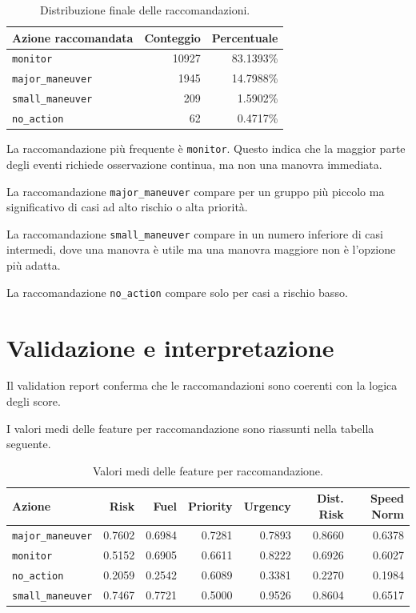 \documentclass[12pt,a4paper]{article}
\begin{document}
\begin{table}[H]
\centering
\begin{tabular}{lrr}
\toprule
Azione raccomandata & Conteggio & Percentuale \\
\midrule
\texttt{monitor} & 10927 & 83.1393\% \\
\texttt{major\_maneuver} & 1945 & 14.7988\% \\
\texttt{small\_maneuver} & 209 & 1.5902\% \\
\texttt{no\_action} & 62 & 0.4717\% \\
\bottomrule
\end{tabular}
\caption{Distribuzione finale delle raccomandazioni.}
\end{table}

La raccomandazione più frequente è \texttt{monitor}. Questo indica che la maggior parte degli eventi richiede osservazione continua, ma non una manovra immediata.

La raccomandazione \texttt{major\_maneuver} compare per un gruppo più piccolo ma significativo di casi ad alto rischio o alta priorità.

La raccomandazione \texttt{small\_maneuver} compare in un numero inferiore di casi intermedi, dove una manovra è utile ma una manovra maggiore non è l'opzione più adatta.

La raccomandazione \texttt{no\_action} compare solo per casi a rischio basso.

\section{Validazione e interpretazione}

Il validation report conferma che le raccomandazioni sono coerenti con la logica degli score.

I valori medi delle feature per raccomandazione sono riassunti nella tabella seguente.

\begin{table}[H]
\centering
\begin{tabular}{lrrrrrr}
\toprule
Azione & Risk & Fuel & Priority & Urgency & Dist. Risk & Speed Norm \\
\midrule
\texttt{major\_maneuver} & 0.7602 & 0.6984 & 0.7281 & 0.7893 & 0.8660 & 0.6378 \\
\texttt{monitor} & 0.5152 & 0.6905 & 0.6611 & 0.8222 & 0.6926 & 0.6027 \\
\texttt{no\_action} & 0.2059 & 0.2542 & 0.6089 & 0.3381 & 0.2270 & 0.1984 \\
\texttt{small\_maneuver} & 0.7467 & 0.7721 & 0.5000 & 0.9526 & 0.8604 & 0.6517 \\
\bottomrule
\end{tabular}
\caption{Valori medi delle feature per raccomandazione.}
\end{table}
\end{document}
